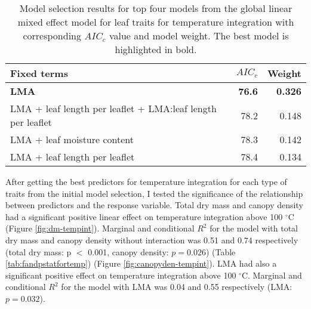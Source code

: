 \documentclass{ttuthes2007}
\begin{document}


\begin{table}
  \centering
  \caption{Model selection results for top four models from the global linear
    mixed effect model for leaf traits for temperature integration with
    corresponding $AIC_{c}$ value and model weight. The best model is highlighted in bold.}
  \begin{tabular}{lrr}
    \toprule
    \textbf{Fixed terms} & $AIC_{c}$ & \textbf{Weight}\\
    \midrule
    \textbf{LMA} & \textbf{76.6} & \textbf{0.326} \\
    LMA + leaf length per leaflet + LMA:leaf length per leaflet & 78.2     & 0.148    \\
    LMA + leaf moisture content                                 & 78.3     & 0.142    \\
    LMA + leaf length per leaflet                               & 78.4     & 0.134    \\
    \bottomrule
  \end{tabular}
  \label{tab:leaf_models}
\end{table}




After getting the best predictors for temperature integration for each type of traits from the initial model selection,
I tested the significance of the relationship  between predictors and the response variable. Total dry mass and canopy density had a significant positive linear effect %
on temperature integration above 100 $^{\circ}$C (Figure \ref{fig:dm-tempint}). Marginal and conditional $R^2$ for the model with total dry mass and canopy density without interaction was 0.51 and 0.74 respectively (total dry mass: p $<$ 0.001, canopy density: $p = 0.026$) (Table \ref{tab:fandpstatfortemp}) (Figure \ref{fig:canopyden-tempint}). LMA had also a significant positive effect on temperature integration above 100 $^{\circ}$C. Marginal  and conditional $R^2$ for the model with LMA was 0.04 and 0.55 respectively (LMA: $p = 0.032$). 
\end{document}
